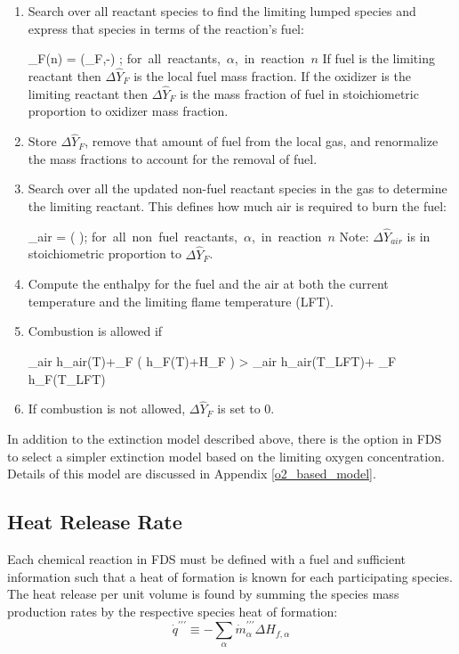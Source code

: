 \begin{enumerate}
\item Search over all reactant species to find the limiting lumped species and express that species in terms of the reaction's fuel:

\be {}_{F}(n) = \min \left (_F,-\right) \quad ; \quad \mbox{for all reactants, $\alpha$, in reaction $n$} \ee
If fuel is the limiting reactant then $\Delta \hat{Y}_{F}$ is the local fuel mass fraction. If the oxidizer is the limiting reactant then $\Delta \hat{Y}_{F}$ is the mass fraction of fuel in stoichiometric proportion to oxidizer mass fraction.
\item Store $\Delta \hat{Y}_{F}$, remove that amount of fuel from the local gas, and renormalize the mass fractions to account for the removal of fuel.
\item Search over all the updated non-fuel reactant species in the gas to determine the limiting reactant.  This defines how much air is required to burn the fuel:

\be \Delta {}_{air} = \min \left( \right); \quad \mbox{for all non fuel reactants, $\alpha$, in reaction $n$} \ee
Note: $\Delta \hat{Y}_{air}$ is in stoichiometric proportion to $\Delta \hat{Y}_{F}$.
\item Compute the enthalpy for the fuel and the air at both the current temperature and the limiting flame temperature (LFT).
\item Combustion is allowed if

\be \Delta {}_{air} h_{air}(T)+\Delta {}_{F} \left( h_F(T)+\Delta H_F \right) > \Delta {}_{air} h_{air}(T_{LFT})+ \Delta {}_{F} h_F(T_{LFT}) \ee
\item If combustion is not allowed, $\Delta \hat{Y}_{F}$ is set to 0.
\end{enumerate}

In addition to the extinction model described above, there is the option in FDS to select a simpler extinction model based on the limiting oxygen concentration. Details of this model are discussed in Appendix \ref{o2_based_model}.

\subsection{Heat Release Rate}

Each chemical reaction in FDS must be defined with a fuel and sufficient information such that a heat of formation is known for each participating species. The heat release per unit volume is found by summing the species mass production rates by the respective species heat of formation:
\begin{equation}\label{eq:vol_heat_gen}
\dot{q}^{\prime\prime\prime} \equiv -\displaystyle \sum_{\alpha} \dot{m}^{\prime\prime\prime}_{\alpha} \Delta H_{f,\alpha}
\end{equation}

